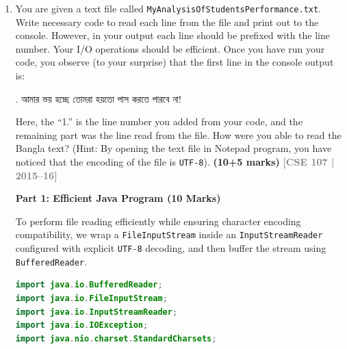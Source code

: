 \documentclass[12pt,a3paper]{article}
\newcommand{\yr}[1]{\hfill\textcolor{gray}{\small\textbf{[#1]}}}
\newcommand{\mk}[1]{\textcolor{orange!70!black}{\small\textbf{(#1 marks)}}}
\begin{document}
\begin{enumerate}
\begin{tcolorbox}
\begin{lstlisting}[language=Java]
        // Read object from "serial" and assign to object2
        MyClass object2 = null;
        try (ObjectInputStream ois = new ObjectInputStream(
                 new FileInputStream("serial"))) {
            object2 = (MyClass) ois.readObject();
            System.out.println("Read:    " + object2);
        } catch (IOException | ClassNotFoundException e) {
            e.printStackTrace();
        }
    }
}
\end{lstlisting}
\textbf{Output:}
\begin{verbatim}
Written: MyClass{id=42,name=Alice}
Read:    MyClass{id=42,name=Alice}
\end{verbatim}
\end{tcolorbox}

\item You are given a text file called \texttt{MyAnalysisOfStudentsPerformance.txt}. Write necessary code to read each line from the file and print out to the console. However, in your output each line should be prefixed with the line number. Your I/O operations should be efficient. Once you have run your code, you observe (to your surprise) that the first line in the console output is:
\begin{center}
    {. আমার ভয় হচ্ছে তোমরা হয়তো পাস করতে পারবে না!}
\end{center}
Here, the ``1.'' is the line number you added from your code, and the remaining part was the line read from the file. How were you able to read the Bangla text? (Hint: By opening the text file in Notepad program, you have noticed that the encoding of the file is \texttt{UTF-8}). \mk{10+5}
\yr{CSE 107 | 2015--16}

\begin{tcolorbox}[enhanced,breakable,ansbox,
  colback=cA!4,colframe=cA,boxrule=0.8pt,arc=5pt,
  title={\textbf{Answer --- Efficient File I/O with UTF-8 Encoding}},
  fonttitle=\bfseries\color{white},colbacktitle=cA]

\textbf{Part 1: Efficient Java Program (10 Marks)}

To perform file reading efficiently while ensuring character encoding compatibility, we wrap a \texttt{FileInputStream} inside an \texttt{InputStreamReader} configured with explicit \texttt{UTF-8} decoding, and then buffer the stream using \texttt{BufferedReader}.

\begin{lstlisting}[language=Java]
import java.io.BufferedReader;
import java.io.FileInputStream;
import java.io.InputStreamReader;
import java.io.IOException;
import java.nio.charset.StandardCharsets;


\end{lstlisting}
\end{tcolorbox}
\end{enumerate}
\end{document}
